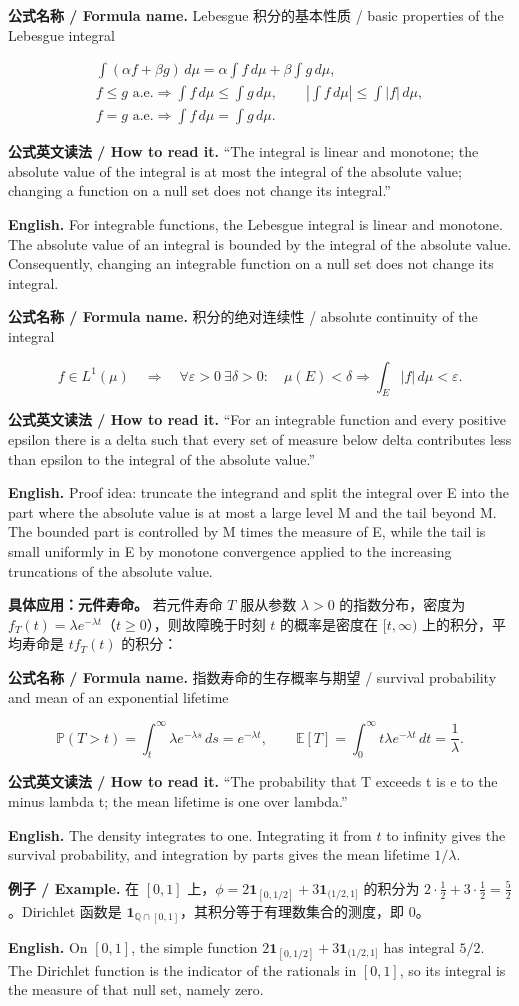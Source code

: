 \documentclass[UTF8,11pt,a4paper]{ctexart}
\newcommand{\EN}[1]{\par\noindent\textbf{English.} #1\par}
\newcommand{\READ}[1]{\par\noindent\textbf{公式英文读法 / How to read it.} #1\par}
\newcommand{\FORMULA}[2]{\par\Needspace{3\baselineskip}\noindent\textbf{公式名称 / Formula name.} #1 / #2\par}
\newcommand{\EX}[2]{\par\noindent\textbf{例子 / Example.} #1\par\EN{#2}}
\begin{document}
\FORMULA{Lebesgue 积分的基本性质}{basic properties of the Lebesgue integral}
\[
\begin{gathered}
\int(\alpha f+\beta g)\,d\mu
=\alpha\int f\,d\mu+\beta\int g\,d\mu,\\
f\le g\text{ a.e.}\Longrightarrow\int f\,d\mu\le\int g\,d\mu,
\qquad
\left|\int f\,d\mu\right|\le\int|f|\,d\mu,\\
f=g\text{ a.e.}\Longrightarrow\int f\,d\mu=\int g\,d\mu.
\end{gathered}
\]
\READ{“The integral is linear and monotone; the absolute value of the integral is at most the integral of the absolute value; changing a function on a null set does not change its integral.”}
\EN{For integrable functions, the Lebesgue integral is linear and monotone. The absolute value of an integral is bounded by the integral of the absolute value. Consequently, changing an integrable function on a null set does not change its integral.}
\FORMULA{积分的绝对连续性}{absolute continuity of the integral}
\[
f\in L^1(\mu)
\quad\Longrightarrow\quad
\forall\varepsilon>0\ \exists\delta>0:\quad
\mu(E)<\delta\Rightarrow\int_E|f|\,d\mu<\varepsilon.
\]
\READ{“For an integrable function and every positive epsilon there is a delta such that every set of measure below delta contributes less than epsilon to the integral of the absolute value.”}
\EN{Proof idea: truncate the integrand and split the integral over E into the part where the absolute value is at most a large level M and the tail beyond M. The bounded part is controlled by M times the measure of E, while the tail is small uniformly in E by monotone convergence applied to the increasing truncations of the absolute value.}
\noindent\textbf{具体应用：元件寿命。} 若元件寿命 $T$ 服从参数 $\lambda>0$ 的指数分布，密度为 $f_T(t)=\lambda e^{-\lambda t}$（$t\ge0$），则故障晚于时刻 $t$ 的概率是密度在 $[t,\infty)$ 上的积分，平均寿命是 $t f_T(t)$ 的积分：
\FORMULA{指数寿命的生存概率与期望}{survival probability and mean of an exponential lifetime}
\[
\mathbb P(T>t)=\int_t^\infty\lambda e^{-\lambda s}\,ds=e^{-\lambda t},
\qquad
\mathbb E[T]=\int_0^\infty t\lambda e^{-\lambda t}\,dt=\frac1\lambda.
\]
\READ{“The probability that T exceeds t is e to the minus lambda t; the mean lifetime is one over lambda.”}
\EN{The density integrates to one. Integrating it from $t$ to infinity gives the survival probability, and integration by parts gives the mean lifetime $1/\lambda$.}
\EX{在 $[0,1]$ 上，$\phi=2\mathbf1_{[0,1/2]}+3\mathbf1_{(1/2,1]}$ 的积分为 $2\cdot\frac12+3\cdot\frac12=\frac52$。Dirichlet 函数是 $\mathbf1_{\mathbb Q\cap[0,1]}$，其积分等于有理数集合的测度，即 $0$。}{On $[0,1]$, the simple function $2\mathbf1_{[0,1/2]}+3\mathbf1_{(1/2,1]}$ has integral $5/2$. The Dirichlet function is the indicator of the rationals in $[0,1]$, so its integral is the measure of that null set, namely zero.}
\end{document}

